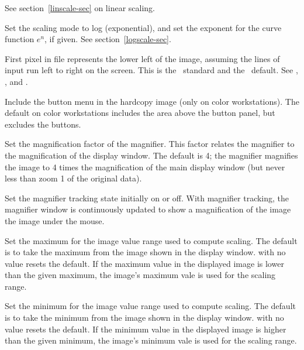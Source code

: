 \begin{description}

See section~\ref{linscale-sec} on linear scaling.


Set the scaling mode to log (exponential), and set the exponent
for the curve function $e^n$, if given.  See section~\ref{logscale-sec}.


First pixel in file represents the lower left of the image,
assuming the lines of input run left to right on the screen.
This is the \IRAF\ standard and the \SAO\ default.
See , , and .


Include the button menu in the hardcopy image (only on color
workstations).  The default on color workstations includes the
area above the button panel, but excludes the buttons.


Set the magnification factor of the magnifier.  This
factor relates the magnifier to the magnification of the
display window.  The default is 4; the magnifier magnifies
the image to 4 times the magnification of the main display
window (but never less than zoom 1 of the original data).


Set the magnifier tracking state initially on or off.  With magnifier
tracking, the magnifier window is continuously updated to show
a magnification of the image the image under the mouse.


Set the maximum for the image value range used to compute
scaling.  The default is to take the maximum from the image
shown in the display window.   with no value resets the
default.  If the maximum value in the displayed image is
lower than the given maximum, the image's maximum vale is
used for the scaling range.


Set the minimum for the image value range used to compute
scaling.  The default is to take the minimum from the image
shown in the display window.   with no value resets the
default.  If the minimum value in the displayed image is
higher than the given minimum, the image's minimum vale is
used for the scaling range.


\end{description}
